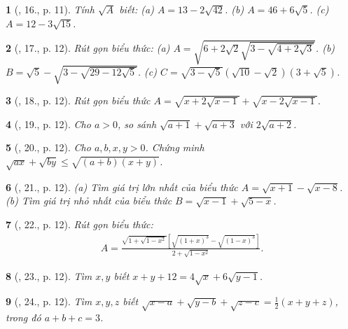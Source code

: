 \documentclass{article}
\newtheorem{baitoan}{}%
\begin{document}
\begin{baitoan}[\cite{Tuyen_Toan_9_old}, 16., p. 11]
	Tính $\sqrt{A}$ biết: (a) $A = 13 - 2\sqrt{42}$. (b) $A = 46 + 6\sqrt{5}$. (c) $A = 12 - 3\sqrt{15}$.
\end{baitoan}

\begin{baitoan}[\cite{Tuyen_Toan_9_old}, 17., p. 12]
	Rút gọn biểu thức: (a) $A = \sqrt{6 + 2\sqrt{2}\sqrt{3 - \sqrt{4 + 2\sqrt{3}}}}$. (b) $B = \sqrt{5} - \sqrt{3 - \sqrt{29 - 12\sqrt{5}}}$. (c) $C = \sqrt{3 - \sqrt{5}}(\sqrt{10} - \sqrt{2})(3 + \sqrt{5})$.
\end{baitoan}

\begin{baitoan}[\cite{Tuyen_Toan_9_old}, 18., p. 12]
	Rút gọn biểu thức $A = \sqrt{x + 2\sqrt{x - 1}} + \sqrt{x - 2\sqrt{x - 1}}$.
\end{baitoan}

\begin{baitoan}[\cite{Tuyen_Toan_9_old}, 19., p. 12]
	Cho $a > 0$, so sánh $\sqrt{a + 1} + \sqrt{a + 3}$ với $2\sqrt{a + 2}$.
\end{baitoan}

\begin{baitoan}[\cite{Tuyen_Toan_9_old}, 20., p. 12]
	Cho $a,b,x,y > 0$. Chứng minh $\sqrt{ax} + \sqrt{by}\le\sqrt{(a + b)(x + y)}$.
\end{baitoan}

\begin{baitoan}[\cite{Tuyen_Toan_9_old}, 21., p. 12]
	(a) Tìm giá trị lớn nhất của biểu thức $A = \sqrt{x + 1} - \sqrt{x - 8}$. (b) Tìm giá trị nhỏ nhất của biểu thức $B = \sqrt{x - 1} + \sqrt{5 - x}$.
\end{baitoan}

\begin{baitoan}[\cite{Tuyen_Toan_9_old}, 22., p. 12]
	Rút gọn biểu thức:
	\begin{align*}
		A = \frac{\sqrt{1 + \sqrt{1 - x^2}}\left[\sqrt{(1 + x)^3} - \sqrt{(1 - x)^3}\right]}{2 + \sqrt{1 - x^2}}.
	\end{align*}
\end{baitoan}

\begin{baitoan}[\cite{Tuyen_Toan_9_old}, 23., p. 12]
	Tìm $x,y$ biết $x + y + 12 = 4\sqrt{x} + 6\sqrt{y - 1}$.
\end{baitoan}

\begin{baitoan}[\cite{Tuyen_Toan_9_old}, 24., p. 12]
	Tìm $x,y,z$ biết $\sqrt{x - a} + \sqrt{y - b} + \sqrt{z - c} = \frac{1}{2}(x + y + z)$, trong đó $a + b + c = 3$.
\end{baitoan}
\end{document}
